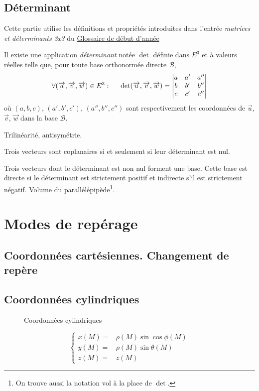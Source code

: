 \subsection{Déterminant}
Cette partie utilise les définitions et propriétés introduites dans l'entrée \emph{matrices et déterminants 3x3} du \href{\baseurl C4199.pdf}{Glossaire de début d'année}
\begin{prop}
 Il existe une application \emph{déterminant} notée $\det$ définie dans $E^3$ et à valeurs réelles telle que, pour toute base orthonormée directe $\mathcal{B}$,
\begin{displaymath}
\forall (\overrightarrow{u},\overrightarrow{v},\overrightarrow{w})\in E^3 :\hspace{0.5cm}
\det(\overrightarrow{u},\overrightarrow{v},\overrightarrow{w})=
\begin{vmatrix}
 a & a' & a'' \\
 b & b' & b'' \\
 c & c' & c''
\end{vmatrix}
\end{displaymath}
où $(a,b,c)$, $(a',b',c')$, $(a'',b'',c'')$ sont respectivement les coordonnées de $\overrightarrow{u}$, $\overrightarrow{v}$, $\overrightarrow{w}$ dans la base $\mathcal B$.
\end{prop}
Trilinéarité, antisymétrie.

\begin{prop}
 Trois vecteurs sont coplanaires si et seulement si leur déterminant est nul.
\end{prop}
Trois vecteurs dont le déterminant est non nul forment une base. Cette base est directe si le déterminant est strictement positif et indirecte s'il est strictement négatif.
Volume du parallélépipède\footnote{On trouve aussi la notation $\text{vol}$ à la place de $\det$.}.

\section{Modes de repérage}
\subsection{Coordonnées cartésiennes. Changement de repère}
\subsection{Coordonnées cylindriques}
\begin{figure}[ht]
 \centering

\caption{Coordonnées cylindriques}
\label{fig:C2006_1}
\end{figure}
\begin{displaymath}
 \left\lbrace 
\begin{aligned}
x(M) =& \rho(M)\sin \cos \phi(M) \\
y(M) =& \rho(M)\sin \theta(M) \\
z(M) =& z(M) 
 \end{aligned}
 \right. 
\end{displaymath}

